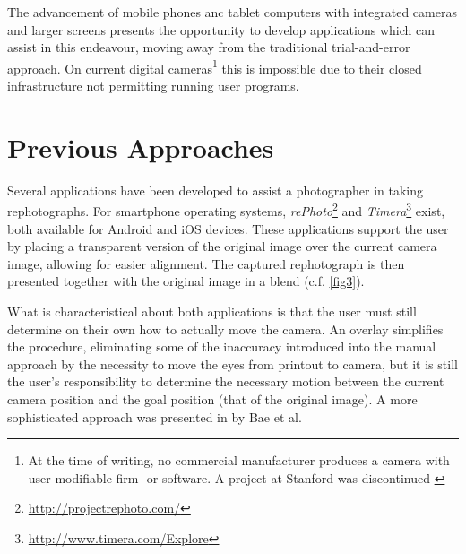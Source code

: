 The advancement of mobile phones anc tablet computers with integrated cameras
and larger screens presents the opportunity to develop applications which can
assist in this endeavour, moving away from the traditional trial-and-error
approach.  On current digital cameras\footnote{At the time of writing, no
   commercial manufacturer produces a camera with user-modifiable firm- or
software. A project at Stanford \citep{Levoy2010} was discontinued
\cite{FrankenCam}} this is impossible due to their closed infrastructure not
permitting running user programs. 

\section{Previous Approaches}

Several applications have been developed to assist a photographer in taking
rephotographs. For smartphone operating systems,
\emph{rePhoto}\footnote{\url{http://projectrephoto.com/}} and
\emph{Timera}\footnote{\url{http://www.timera.com/Explore}} exist, both
available for Android and iOS devices. These applications support the user by placing a transparent
version of the original image over the current camera image, allowing for easier
alignment. The captured rephotograph is then presented together with the
original image in a blend (c.f. \autoref{fig3}).

What is characteristical about both applications is that the user must still
determine on their own how to actually move the camera. An overlay simplifies
the procedure, eliminating some of the inaccuracy introduced into the manual approach by the
necessity to move the eyes from printout to camera, but it is still the user's
responsibility to determine the necessary motion between the current camera
position and the goal position (that of the original image). A more
sophisticated approach was presented in \citep{bae2010} by Bae et al.


